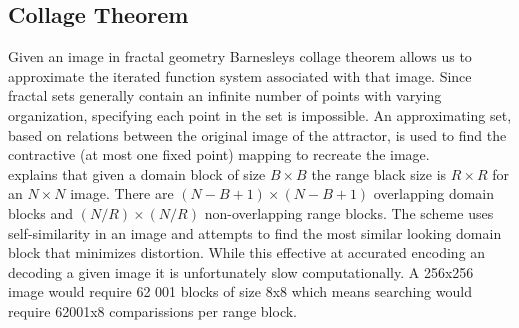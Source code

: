 \documentclass[12pt]{article}
\begin{document}
\subsection{Collage Theorem}
{\parindent0pt
Given an image in fractal geometry  Barnesleys collage theorem allows us to approximate the iterated function system associated with that image.\cite{iraq} Since fractal sets generally contain an infinite number of points with varying organization, specifying each point in the set is impossible. \cite{ifs}An approximating set, based on  relations between the original image of the attractor, is used to find the contractive (at most one fixed point) mapping to recreate the image. \\ 

\cite{china} explains that given a domain block of size $B \times B$ the range black size is $R \times R$ for an $N \times N$ image. There are $(N-B+1) \times (N-B+1)$ overlapping domain blocks and $(N/R) \times (N/R)$ non-overlapping range blocks. The scheme uses self-similarity in an image and attempts to find the most similar looking domain block that minimizes distortion. While this effective at accurated encoding an decoding a given image it is unfortunately slow computationally. A 256x256 image would require 62 001 blocks of size 8x8 which means searching would require 62001x8 comparissions per range block. 
}
\end{document}
